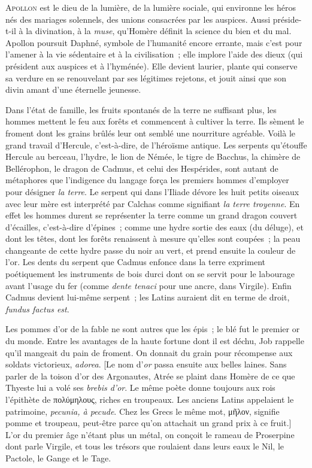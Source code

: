 \documentclass[french,twoside]{book} %
\begin{document}
{\scshape Apollon} est le dieu de la lumière, de la lumière sociale, qui environne les héros nés des mariages solennels, des unions consacrées par les auspices. Aussi préside-t-il à la divination, à la {\itshape muse}, qu’Homère définit la science du bien et du mal. Apollon poursuit Daphné, symbole de l’humanité encore errante, mais c’est pour l’amener à la vie sédentaire et à la civilisation ; elle implore l’aide des dieux (qui président aux auspices et à l’hyménée). Elle devient laurier, plante qui conserve sa verdure en se renouvelant par ses légitimes rejetons, et jouit ainsi que son divin amant d’une éternelle jeunesse.\par
Dans l’état de famille, les fruits spontanés de la terre ne suffisant plus, les hommes mettent le feu aux forêts et commencent à cultiver la terre. Ils sèment le froment dont les grains brûlés leur ont semblé une nourriture agréable. Voilà le grand travail d’Hercule, c’est-à-dire, de l’héroïsme antique. Les serpents qu’étouffe Hercule au berceau, l’hydre, le lion de Némée, le tigre de Bacchus, la chimère de Bellérophon, le dragon de Cadmus, et celui des Hespérides, sont autant de métaphores que l’indigence du langage força les premiers hommes d’employer pour désigner {\itshape la terre}. Le serpent qui dans l’Iliade dévore les huit petits oiseaux avec leur mère est interprété par Calchas comme signifiant {\itshape la terre troyenne}. En effet les hommes durent se représenter la terre comme un grand dragon couvert d’écailles, c’est-à-dire d’épines ; comme une hydre sortie des eaux (du déluge), et dont les têtes, dont les forêts renaissent à mesure qu’elles sont coupées ; la peau changeante de cette hydre passe du noir au vert, et prend ensuite la couleur de l’or. Les dents du serpent que Cadmus enfonce dans la terre expriment poétiquement les instruments de bois durci dont on se servit pour le labourage avant l’usage du fer (comme {\itshape dente tenaci} pour une ancre, dans Virgile). Enfin Cadmus devient lui-même serpent ; les Latins auraient dit en terme de droit, {\itshape fundus factus est}.\par
Les pommes d’or de la fable ne sont autres que les épis ; le blé fut le premier or du monde. Entre les avantages de la haute fortune dont il est déchu, Job rappelle qu’il mangeait du pain de froment. On donnait du grain pour récompense aux soldats victorieux, {\itshape adorea}. [Le nom d’{\itshape or} passa ensuite aux belles laines. Sans parler de la toison d’or des Argonautes, Atrée se plaint dans Homère de ce que Thyeste lui a volé ses {\itshape brebis d’or}.  Le même poète donne toujours aux rois l’épithète de πολύμηλους, riches en troupeaux. Les anciens Latins appelaient le patrimoine, {\itshape pecunia, à pecude}. Chez les Grecs le même mot, μῆλον, signifie pomme et troupeau, peut-être parce qu’on attachait un grand prix à ce fruit.] L’or du premier âge n’étant plus un métal, on conçoit le rameau de Proserpine dont parle Virgile, et tous les trésors que roulaient dans leurs eaux le Nil, le Pactole, le Gange et le Tage.\par
\end{document}
